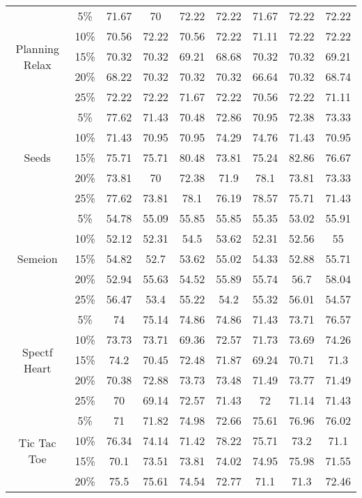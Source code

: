 \begin{longtable}[c]{|c|c|c|c|c|c|c|c|c|}
\multirow{5}{*}{Planning Relax}
& 5\% & 71.67 & 70 & 72.22 & 72.22 & 71.67 & 72.22 & 72.22 \\
& 10\% & 70.56 & 72.22 & 70.56 & 72.22 & 71.11 & 72.22 & 72.22 \\
& 15\% & 70.32 & 70.32 & 69.21 & 68.68 & 70.32 & 70.32 & 69.21 \\
& 20\% & 68.22 & 70.32 & 70.32 & 70.32 & 66.64 & 70.32 & 68.74 \\
& 25\% & 72.22 & 72.22 & 71.67 & 72.22 & 70.56 & 72.22 & 71.11 \\ \hline
\multirow{5}{*}{Seeds}
& 5\% & 77.62 & 71.43 & 70.48 & 72.86 & 70.95 & 72.38 & 73.33 \\
& 10\% & 71.43 & 70.95 & 70.95 & 74.29 & 74.76 & 71.43 & 70.95 \\
& 15\% & 75.71 & 75.71 & 80.48 & 73.81 & 75.24 & 82.86 & 76.67 \\
& 20\% & 73.81 & 70 & 72.38 & 71.9 & 78.1 & 73.81 & 73.33 \\
& 25\% & 77.62 & 73.81 & 78.1 & 76.19 & 78.57 & 75.71 & 71.43 \\ \hline
\multirow{5}{*}{Semeion}
& 5\% & 54.78 & 55.09 & 55.85 & 55.85 & 55.35 & 53.02 & 55.91 \\
& 10\% & 52.12 & 52.31 & 54.5 & 53.62 & 52.31 & 52.56 & 55 \\
& 15\% & 54.82 & 52.7 & 53.62 & 55.02 & 54.33 & 52.88 & 55.71 \\
& 20\% & 52.94 & 55.63 & 54.52 & 55.89 & 55.74 & 56.7 & 58.04 \\
& 25\% & 56.47 & 53.4 & 55.22 & 54.2 & 55.32 & 56.01 & 54.57 \\ \hline
\multirow{5}{*}{Spectf Heart}
& 5\% & 74 & 75.14 & 74.86 & 74.86 & 71.43 & 73.71 & 76.57 \\
& 10\% & 73.73 & 73.71 & 69.36 & 72.57 & 71.73 & 73.69 & 74.26 \\
& 15\% & 74.2 & 70.45 & 72.48 & 71.87 & 69.24 & 70.71 & 71.3 \\
& 20\% & 70.38 & 72.88 & 73.73 & 73.48 & 71.49 & 73.77 & 71.49 \\
& 25\% & 70 & 69.14 & 72.57 & 71.43 & 72 & 71.14 & 71.43 \\ \hline
\multirow{5}{*}{Tic Tac Toe}
& 5\% & 71 & 71.82 & 74.98 & 72.66 & 75.61 & 76.96 & 76.02 \\
& 10\% & 76.34 & 74.14 & 71.42 & 78.22 & 75.71 & 73.2 & 71.1 \\
& 15\% & 70.1 & 73.51 & 73.81 & 74.02 & 74.95 & 75.98 & 71.55 \\
& 20\% & 75.5 & 75.61 & 74.54 & 72.77 & 71.1 & 71.3 & 72.46 \\

\end{longtable}
